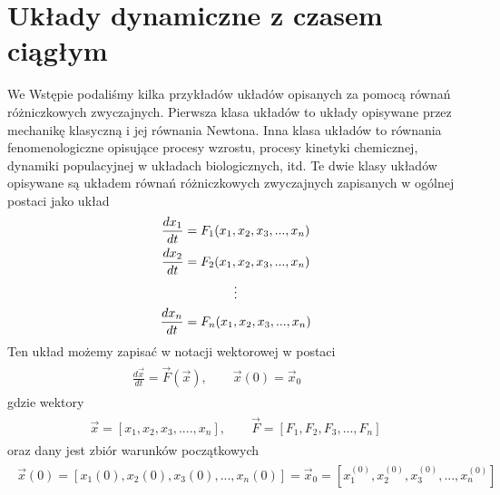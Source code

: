 \documentclass[a4paper,12pt,polish]{sphinxmanual}
\begin{document}
\section{Układy dynamiczne z czasem ciągłym}
\label{ch1/chI021::doc}\label{ch1/chI021:uklady-dynamiczne-z-czasem-ciaglym}
We Wstępie podaliśmy kilka przykładów układów opisanych za pomocą równań różniczkowych zwyczajnych. Pierwsza klasa układów to  układy opisywane przez  mechanikę klasyczną i jej  równania Newtona. Inna klasa układów to równania fenomenologiczne opisujące procesy wzrostu, procesy kinetyki chemicznej, dynamiki populacyjnej w układach biologicznych, itd. Te dwie klasy układów opisywane są układem równań różniczkowych zwyczajnych zapisanych w ogólnej postaci jako układ
\label{ch1/chI021:equation-eqn1}\begin{gather}
\begin{split}\frac{dx_1}{dt} = F_1(x_1, x_2, x_3, ..., x_n)\end{split}\label{ch1/chI021-eqn1}\\\begin{split}\frac{dx_2}{dt} = F_2(x_1, x_2, x_3, ..., x_n)\end{split}\notag\\\begin{split}\vdots\end{split}\notag\\\begin{split}\frac{dx_n}{dt} = F_n(x_1, x_2, x_3, ..., x_n)\end{split}\notag
\end{gather}
Ten układ możemy zapisać w notacji wektorowej w  postaci
\label{ch1/chI021:equation-eqn5}\begin{gather}
\begin{split}\frac{d\vec x}{dt} = \vec F(\vec x), \quad \quad \vec x(0)  = \vec x_0  \qquad \quad\end{split}\label{ch1/chI021-eqn5}
\end{gather}
gdzie wektory
\label{ch1/chI021:equation-eqn6}\begin{gather}
\begin{split}\vec x = [x_1, x_2, x_3, ...., x_n], \quad \quad \vec F = [F_1, F_2, F_3, ..., F_n]\end{split}\label{ch1/chI021-eqn6}
\end{gather}
oraz dany jest zbiór warunków początkowych
\label{ch1/chI021:equation-eqn7}\begin{gather}
\begin{split}\vec x(0) = [x_1(0), x_2(0), x_3(0), ... , x_n(0)] = \vec x_0 = [x_1^{(0)}, x_2^{(0)}, x_3^{(0)}, ... ,  x_n^{(0)}]\end{split}\label{ch1/chI021-eqn7}
\end{gather}
\end{document}
